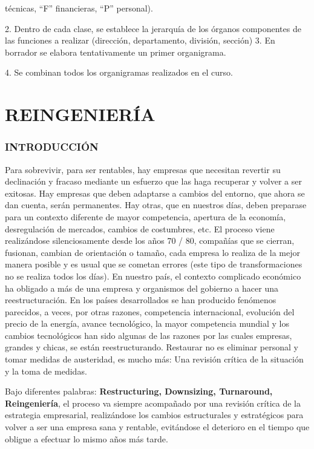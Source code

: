 técnicas, “F” financieras, “P” personal).

2. Dentro de cada clase, se establece la jerarquía de los órganos componentes de las funciones a realizar (dirección, departamento, división, sección) 3. En borrador se elabora tentativamente un primer organigrama.

4. Se combinan todos los organigramas realizados en el curso.



\section*{REINGENIERÍA}
\subsubsection*{INTRODUCCIÓN}
Para sobrevivir, para ser rentables, hay empresas que necesitan revertir su declinación y fracaso mediante un esfuerzo que las haga recuperar y volver a ser exitosas. Hay empresas que deben adaptarse a cambios del entorno, que ahora se dan cuenta, serán permanentes. Hay otras, que en nuestros días, deben preparase para un contexto diferente de mayor competencia, apertura de la economía, desregulación de mercados, cambios de costumbres, etc. El proceso viene realizándose silenciosamente desde los años 70 / 80, compañías que se cierran, fusionan, cambian de orientación o tamaño, cada empresa lo realiza de la mejor manera posible y es usual que se cometan errores (este tipo de transformaciones no se realiza todos los días). En nuestro país, el contexto complicado económico ha obligado a más de una empresa y organismos del gobierno a hacer una reestructuración. En los países desarrollados se han producido fenómenos parecidos, a veces, por otras razones, competencia internacional, evolución del precio de la energía, avance tecnológico, la mayor competencia mundial y los cambios tecnológicos han sido algunas de las razones por las cuales empresas, grandes y chicas, se están reestructurando. Restaurar no es eliminar personal y tomar medidas de austeridad, es mucho más: Una revisión crítica de la situación y la toma de medidas.

Bajo diferentes palabras: \textbf{Restructuring, Downsizing, Turnaround, Reingeniería}, el proceso va siempre acompañado por una revisión crítica de la estrategia empresarial, realizándose los cambios estructurales y estratégicos para volver a ser una empresa sana y rentable, evitándose el deterioro en el tiempo que obligue a efectuar lo mismo años más tarde.

